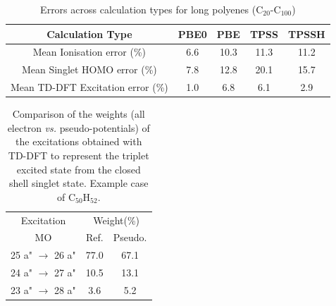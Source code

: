 \documentclass[12pt]{article}
\begin{document}
\newpage

\begin{table}[h]
\caption{Errors across calculation types for long polyenes (C\(_{20}\)-C\(_{100}\))}
\begin{tabular}{c c c c c }
\hline
Calculation Type & PBE0 & PBE & TPSS & TPSSH \\
\hline
Mean Ionisation  error (\%) & 6.6 & 10.3 & 11.3 & 11.2 \\
Mean Singlet HOMO  error (\%) & 7.8 & 12.8 & 20.1 & 15.7 \\
Mean TD-DFT Excitation error (\%) & 1.0 & 6.8 & 6.1 & 2.9 \\ 
\hline
\end{tabular}
\label{table:long_alkene_errors}
\end{table}

\newpage

\begin{table}
\caption{\label{tab:coef}Comparison of the weights (all electron \emph{vs.} pseudo-potentials)
of the excitations obtained with TD-DFT
to represent the triplet excited state from the closed shell singlet state.
Example case of C$_{50}$H$_{52}$.}
\begin{tabular}{c c c c}
\hline
\multicolumn{2}{c}{Excitation} & \multicolumn{2}{c}{Weight(\%)}\\
\multicolumn{2}{c}{MO} & Ref. & Pseudo.\\
\hline
\multicolumn{2}{c}{25 a" \(\rightarrow\) 26 a"} & 77.0 &   67.1  \\
\multicolumn{2}{c}{24 a" \(\rightarrow\) 27 a"} & 10.5 &   13.1  \\
\multicolumn{2}{c}{23 a" \(\rightarrow\) 28 a"} & 3.6  &    5.2  \\
\hline
\end{tabular}
\end{table}
\end{document}
